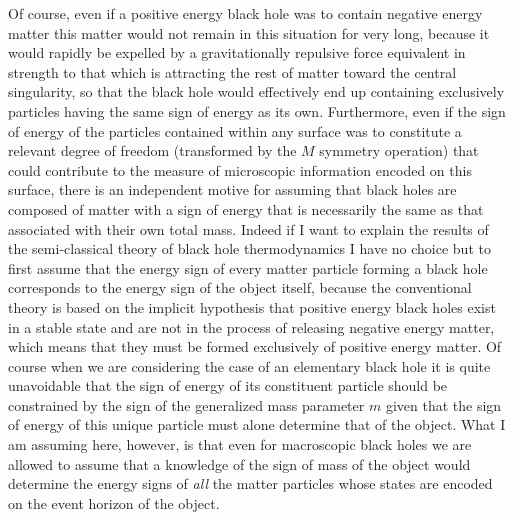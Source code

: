 \documentclass[notitlepage,12pt]{report}
\begin{document}
Of course, even if a positive energy black hole was to contain negative energy matter this matter would not remain in this situation for very long, because it would rapidly be expelled by a gravitationally repulsive force equivalent in strength to that which is attracting the rest of matter toward the central singularity, so that the black hole would effectively end up containing exclusively particles having the same sign of energy as its own. Furthermore, even if the sign of energy of the particles contained within any surface was to constitute a relevant degree of freedom (transformed by the $M$ symmetry operation) that could contribute to the measure of microscopic information encoded on this surface, there is an independent motive for assuming that black holes are composed of matter with a sign of energy that is necessarily the same as that associated with their own total mass. Indeed if I want to explain the results of the semi-classical theory of black hole thermodynamics I have no choice but to first assume that the energy sign of every matter particle forming a black hole corresponds to the energy sign of the object itself, because the conventional theory is based on the implicit hypothesis that positive energy black holes exist in a stable state and are not in the process of releasing negative energy matter, which means that they must be formed exclusively of positive energy matter. Of course when we are considering the case of an elementary black hole it is quite unavoidable that the sign of energy of its constituent particle should be constrained by the sign of the generalized mass parameter $m$ given that the sign of energy of this unique particle must alone determine that of the object. What I am assuming here, however, is that even for macroscopic black holes we are allowed to assume that a knowledge of the sign of mass of the object would determine the energy signs of \textit{all} the matter particles whose states are encoded on the event horizon of the object.
\end{document}

